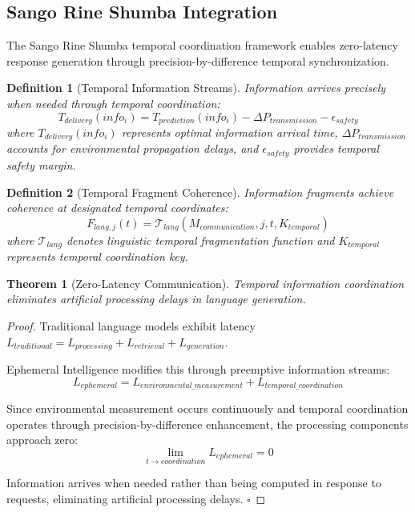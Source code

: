 \documentclass[12pt,a4paper]{article}
\newtheorem{theorem}{Theorem}
\newtheorem{definition}{Definition}
\begin{document}
\subsection{Sango Rine Shumba Integration}

The Sango Rine Shumba temporal coordination framework enables zero-latency response generation through precision-by-difference temporal synchronization.

\begin{definition}[Temporal Information Streams]
Information arrives precisely when needed through temporal coordination:
\begin{equation}
T_{delivery}(info_i) = T_{prediction}(info_i) - \Delta P_{transmission} - \epsilon_{safety}
\end{equation}
where $T_{delivery}(info_i)$ represents optimal information arrival time, $\Delta P_{transmission}$ accounts for environmental propagation delays, and $\epsilon_{safety}$ provides temporal safety margin.
\end{definition}

\begin{definition}[Temporal Fragment Coherence]
Information fragments achieve coherence at designated temporal coordinates:
\begin{equation}
F_{lang,j}(t) = \mathcal{T}_{lang}(M_{communication}, j, t, K_{temporal})
\end{equation}
where $\mathcal{T}_{lang}$ denotes linguistic temporal fragmentation function and $K_{temporal}$ represents temporal coordination key.
\end{definition}

\begin{theorem}[Zero-Latency Communication]
Temporal information coordination eliminates artificial processing delays in language generation.
\end{theorem}

\begin{proof}
Traditional language models exhibit latency $L_{traditional} = L_{processing} + L_{retrieval} + L_{generation}$. 

Ephemeral Intelligence modifies this through preemptive information streams:
\begin{equation}
L_{ephemeral} = L_{environmental\_measurement} + L_{temporal\_coordination}
\end{equation}

Since environmental measurement occurs continuously and temporal coordination operates through precision-by-difference enhancement, the processing components approach zero:
\begin{equation}
\lim_{t \to coordination} L_{ephemeral} = 0
\end{equation}

Information arrives when needed rather than being computed in response to requests, eliminating artificial processing delays. $\square$
\end{proof}
\end{document}
